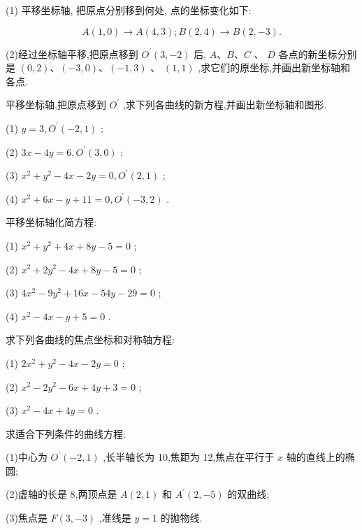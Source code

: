 \documentclass[lang=cn,newtx,10.5pt,scheme=chinese]{elegantbook}
\begin{document}
\begin{problemset}[习 题 十]

\item (1) 平移坐标轴, 把原点分别移到何处, 点的坐标变化如下:

\[
  A\left( {1,0}\right) \rightarrow A\left( {4,3}\right) ;B\left( {2,4}\right) \rightarrow B\left( {2, - 3}\right) .
\]

(2)经过坐标轴平移,把原点移到 \({O}^{\prime }\left( {3, - 2}\right)\) 后, \(A\text{、}B\text{、}C\) 、 \(D\) 各点的新坐标分别是 \(\left( {0,2}\right) \text{、}\left( {-3,0}\right) \text{、}\left( {-1,3}\right)\) 、 \(\left( {1,1}\right)\) ,求它们的原坐标,并画出新坐标轴和各点.

\item 平移坐标轴,把原点移到 \({O}^{\prime }\) ,求下列各曲线的新方程,并画出新坐标轴和图形.

(1) \(y = 3,{O}^{\prime }\left( {-2,1}\right)\) ;

(2) \({3x} - {4y} = 6,{O}^{\prime }\left( {3,0}\right)\) ;

(3) \({x}^{2} + {y}^{2} - {4x} - {2y} = 0,{O}^{\prime }\left( {2,1}\right)\) ;

(4) \({x}^{2} + {6x} - y + {11} = 0,{O}^{\prime }\left( {-3,2}\right)\) .

\item 平移坐标轴化简方程:

(1) \({x}^{2} + {y}^{2} + {4x} + {8y} - 5 = 0\) ;

(2) \({x}^{2} + 2{y}^{2} - {4x} + {8y} - 5 = 0\) ;

(3) \(4{x}^{2} - 9{y}^{2} + {16x} - {54y} - {29} = 0\) ;

(4) \({x}^{2} - {4x} - y + 5 = 0\) .

\item 求下列各曲线的焦点坐标和对称轴方程:

(1) \(2{x}^{2} + {y}^{2} - {4x} - {2y} = 0\) ;

(2) \({x}^{2} - 2{y}^{2} - {6x} + {4y} + 3 = 0\) ;

(3) \({x}^{2} - {4x} + {4y} = 0\) .

\item 求适合下列条件的曲线方程:

(1)中心为 \({O}^{\prime }\left( {-2,1}\right)\) ,长半轴长为 10,焦距为 12,焦点在平行于 \(x\) 轴的直线上的椭圆;

(2)虚轴的长是 8,两顶点是 \(A\left( {2,1}\right)\) 和 \({A}^{\prime }\left( {2, - 5}\right)\) 的双曲线;

(3)焦点是 \(F\left( {3, - 3}\right)\) ,准线是 \(y = 1\) 的抛物线.

\end{problemset}
\end{document}
